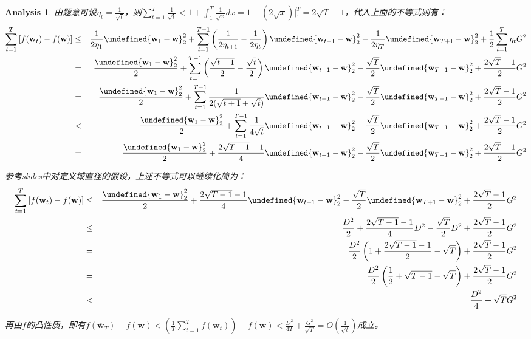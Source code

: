 \documentclass[a4paper,UTF8]{article}
\let\norm\undefined %
\DeclarePairedDelimiter\norm{\lVert}{\rVert}
\numberwithin{equation}{section}
\newtheorem*{myAnalysis}{Analysis}
\begin{document}
\begin{myAnalysis}
由题意可设$\eta_t = \frac{1}{\sqrt{t}}$，则$\sum_{t=1}^T \frac{1}{\sqrt{t}} < 1 + \int_1^T \frac{1}{\sqrt{x}} dx = 1 + (2\sqrt{x})|_1^T = 2\sqrt{T} - 1$，代入上面的不等式则有：
\begin{eqnarray*}
\sum_{t=1}^T \left[ f(\mathbf{w}_t) - f(\mathbf{w}) \right] &\le& \frac{1}{2\eta_1} \norm{\mathbf{w}_1 - \mathbf{w}}_2^2 + \sum_{t=1}^{T - 1} \left( \frac{1}{2\eta_{t+1}} - \frac{1}{2\eta_t} \right) \norm{\mathbf{w}_{t+1} - \mathbf{w}}_2^2 - \frac{1}{2\eta_T}\norm{\mathbf{w}_{T+1} - \mathbf{w}}_2^2 + \frac{1}{2} \sum_{t=1}^T \eta_t G^2 \\
&=& \frac{\norm{\mathbf{w}_1 - \mathbf{w}}_2^2}{2} + \sum_{t=1}^{T - 1} \left( \frac{\sqrt{t+1}}{2} - \frac{\sqrt{t}}{2} \right) \norm{\mathbf{w}_{t+1} - \mathbf{w}}_2^2 - \frac{\sqrt{T}}{2}\norm{\mathbf{w}_{T+1} - \mathbf{w}}_2^2 + \frac{2\sqrt{T} - 1}{2} G^2 \\
&=& \frac{\norm{\mathbf{w}_1 - \mathbf{w}}_2^2}{2} + \sum_{t=1}^{T - 1} \frac{1}{2(\sqrt{t+1} + \sqrt{t})}  \norm{\mathbf{w}_{t+1} - \mathbf{w}}_2^2 - \frac{\sqrt{T}}{2}\norm{\mathbf{w}_{T+1} - \mathbf{w}}_2^2 + \frac{2\sqrt{T} - 1}{2} G^2 \\
&<& \frac{\norm{\mathbf{w}_1 - \mathbf{w}}_2^2}{2} + \sum_{t=1}^{T - 1} \frac{1}{4\sqrt{t}}  \norm{\mathbf{w}_{t+1} - \mathbf{w}}_2^2 - \frac{\sqrt{T}}{2}\norm{\mathbf{w}_{T+1} - \mathbf{w}}_2^2 + \frac{2\sqrt{T} - 1}{2} G^2 \\
&=& \frac{\norm{\mathbf{w}_1 - \mathbf{w}}_2^2}{2} + \frac{2\sqrt{T-1} -1}{4}  \norm{\mathbf{w}_{t+1} - \mathbf{w}}_2^2 - \frac{\sqrt{T}}{2}\norm{\mathbf{w}_{T+1} - \mathbf{w}}_2^2 + \frac{2\sqrt{T} - 1}{2} G^2
\end{eqnarray*}

参考slides中对定义域直径的假设，上述不等式可以继续化简为：
\begin{eqnarray*}
\sum_{t=1}^T \left[ f(\mathbf{w}_t) - f(\mathbf{w}) \right] &\le& \frac{\norm{\mathbf{w}_1 - \mathbf{w}}_2^2}{2} + \frac{2\sqrt{T-1} -1}{4}  \norm{\mathbf{w}_{t+1} - \mathbf{w}}_2^2 - \frac{\sqrt{T}}{2}\norm{\mathbf{w}_{T+1} - \mathbf{w}}_2^2 + \frac{2\sqrt{T} - 1}{2} G^2 \\
&\le& \frac{D^2}{2} + \frac{2\sqrt{T-1} -1}{4}  D^2 - \frac{\sqrt{T}}{2}D^2 + \frac{2\sqrt{T} - 1}{2} G^2 \\
&=& \frac{D^2}{2} \left( 1 + \frac{2\sqrt{T-1} -1}{2} - \sqrt{T} \right) + \frac{2\sqrt{T} - 1}{2} G^2 \\
&=& \frac{D^2}{2} \left( \frac{1}{2} + \sqrt{T-1} - \sqrt{T} \right) + \frac{2\sqrt{T} - 1}{2} G^2 \\
&<& \frac{D^2}{4} + \sqrt{T}G^2
\end{eqnarray*}

再由$f$的凸性质，即有$f(\overline{\mathbf{w}}_T) - f(\mathbf{w}) < \left( \frac{1}{T} \sum_{t=1}^T f(\mathbf{w}_t) \right) - f(\mathbf{w}) < \frac{D^2}{4T} + \frac{G^2}{\sqrt{T}} = O\left(\frac{1}{\sqrt{t}}\right)$成立。

	~\\
	~\\
	~\\
	~\\	
	~\\
\end{myAnalysis}
\end{document}
